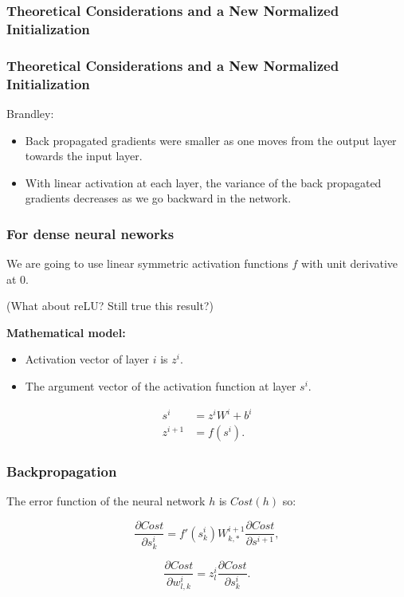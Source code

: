 \subsubsection{Theoretical Considerations and a New Normalized Initialization}
\begin{frame}
  \frametitle{Theoretical Considerations and a New Normalized Initialization}
  Brandley: 
  \begin{itemize}
    \item Back propagated gradients were smaller as one moves from the output layer towards the input layer.
    \item With linear activation at each layer, the variance of the back propagated gradients decreases as we go backward in the network. 
  \end{itemize}

\end{frame}


\begin{frame}
  \frametitle{For dense neural neworks}

  We are going to use linear symmetric activation functions $f$ with unit derivative at 0. 

  (What about reLU? Still true this result?)

  \textbf{Mathematical model: }
  \begin{itemize}
    \item Activation vector of layer $i$ is $z^i$. 
    \item The argument vector of the activation function at layer $s^i$. 
  \end{itemize}

  \begin{align}
    s^i & = z^i W^i + b^i \\
    z^{i+1} & = f(s^i). 
  \end{align}

\end{frame}

\begin{frame}
  \frametitle{Backpropagation }
  The error function of the neural network $h$ is $Cost(h)$ so: 

  \begin{equation}
    \label{eq:partial_cost_wrt_s}
    \frac{\partial Cost }{\partial s^i_k}
    = 
    f'(s_k^i) W_{k, *}^{i+1} 
    \frac{\partial Cost }{\partial s^{i+1}},
  \end{equation}

  \begin{equation}
    \label{eq:partial_cost_wrt_w}
    \frac{\partial Cost }{\partial w^i_{l,k}}
    = 
    z^i_l \frac{\partial Cost }{\partial s^i_k}. 
  \end{equation}
  
\end{frame}

